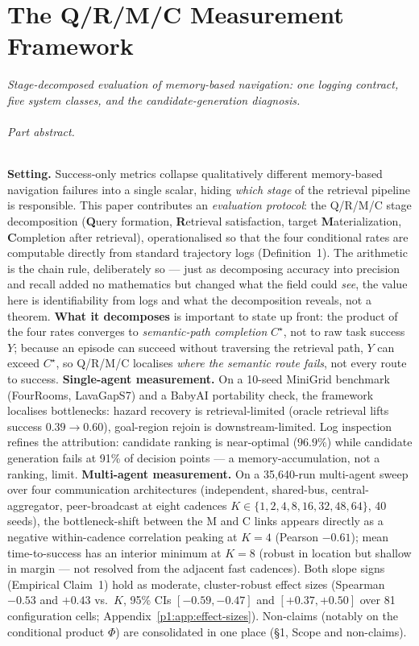 \documentclass{article}
\begin{document}
\clearpage
\tableofcontents
\clearpage
\part{The Q/R/M/C Measurement Framework}
\noindent\textit{Stage-decomposed evaluation of memory-based navigation: one logging contract, five system classes, and the candidate-generation diagnosis.}

\paragraph{Part abstract.} \textbf{Setting.} Success-only metrics collapse qualitatively different memory-based navigation failures into a single scalar, hiding \emph{which stage} of the retrieval pipeline is responsible. This paper contributes an \emph{evaluation protocol}: the Q/R/M/C stage decomposition (\textbf{Q}uery formation, \textbf{R}etrieval satisfaction, target \textbf{M}aterialization, \textbf{C}ompletion after retrieval), operationalised so that the four conditional rates are computable directly from standard trajectory logs (Definition~1). The arithmetic is the chain rule, deliberately so --- just as decomposing accuracy into precision and recall added no mathematics but changed what the field could \emph{see}, the value here is identifiability from logs and what the decomposition reveals, not a theorem. \textbf{What it decomposes} is important to state up front: the product of the four rates converges to \emph{semantic-path completion} $C^\star$, not to raw task success $Y$; because an episode can succeed without traversing the retrieval path, $Y$ can exceed $C^\star$, so Q/R/M/C localises \emph{where the semantic route fails}, not every route to success.
\textbf{Single-agent measurement.} On a 10-seed MiniGrid benchmark (FourRooms, LavaGapS7) and a BabyAI portability check, the framework localises bottlenecks: hazard recovery is retrieval-limited (oracle retrieval lifts success $0.39\to0.60$), goal-region rejoin is downstream-limited. Log inspection refines the attribution: candidate ranking is near-optimal ($96.9\%$) while candidate generation fails at 91\% of decision points --- a memory-accumulation, not a ranking, limit.
\textbf{Multi-agent measurement.} On a 35{,}640-run multi-agent sweep over four communication architectures (independent, shared-bus, central-aggregator, peer-broadcast at eight cadences $K{\in}\{1,2,4,8,16,32,48,64\}$, 40 seeds), the bottleneck-shift between the M and C links appears directly as a negative within-cadence correlation peaking at $K{=}4$ (Pearson $-0.61$); mean time-to-success has an interior minimum at $K{=}8$ (robust in location but shallow in margin --- not resolved from the adjacent fast cadences). Both slope signs (Empirical Claim~1) hold as moderate, cluster-robust effect sizes (Spearman $-0.53$ and $+0.43$ vs.\ $K$, 95\% CIs $[-0.59,-0.47]$ and $[+0.37,+0.50]$ over 81 configuration cells; Appendix~\ref{p1:app:effect-sizes}). Non-claims (notably on the conditional product $\Phi$) are consolidated in one place (\S1, Scope and non-claims).
\end{document}
